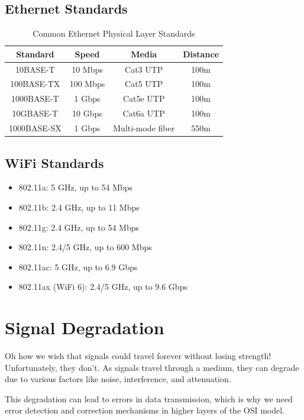 \subsection*{Ethernet Standards}
\begin{table}[h]
    \centering
    \begin{tabular}{|c|c|c|c|}
        \hline
        \textbf{Standard} & \textbf{Speed} & \textbf{Media} & \textbf{Distance} \\
        \hline
        10BASE-T & 10 Mbps & Cat3 UTP & 100m \\
        100BASE-TX & 100 Mbps & Cat5 UTP & 100m \\
        1000BASE-T & 1 Gbps & Cat5e UTP & 100m \\
        10GBASE-T & 10 Gbps & Cat6a UTP & 100m \\
        1000BASE-SX & 1 Gbps & Multi-mode fiber & 550m \\
        \hline
    \end{tabular}
    \caption{Common Ethernet Physical Layer Standards}\label{tab:ethernet_standards}
\end{table}

\subsection*{WiFi Standards}
\begin{itemize}
    \item 802.11a: 5 GHz, up to 54 Mbps
    \item 802.11b: 2.4 GHz, up to 11 Mbps
    \item 802.11g: 2.4 GHz, up to 54 Mbps
    \item 802.11n: 2.4/5 GHz, up to 600 Mbps
    \item 802.11ac: 5 GHz, up to 6.9 Gbps
    \item 802.11ax (WiFi 6): 2.4/5 GHz, up to 9.6 Gbps
\end{itemize}

\section{Signal Degradation}
Oh how we wish that signals could travel forever without losing strength! Unfortunately, they don't. As signals travel through a medium, they can degrade due to various factors like noise, interference, and attenuation.

This degradation can lead to errors in data transmission, which is why we need error detection and correction mechanisms in higher layers of the OSI model.

